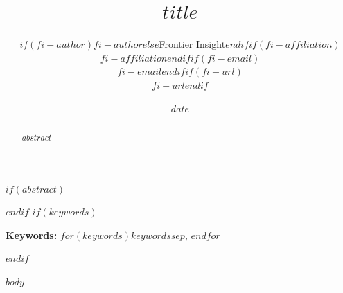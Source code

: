 \documentclass[11pt,a4paper]{article}
\title{$title$}
\author{$if(fi-author)$$fi-author$$else$Frontier Insight$endif$$if(fi-affiliation)$\\{\small $fi-affiliation$}$endif$$if(fi-email)$\\{\small $fi-email$}$endif$$if(fi-url)$\\{\small $fi-url$}$endif$}
\date{$date$}
\begin{document}
\maketitle

$if(abstract)$
\begin{abstract}
$abstract$
\end{abstract}
$endif$
$if(keywords)$
{\small\raggedright\noindent\textbf{Keywords:} $for(keywords)$$keywords$$sep$, $endfor$\par}\medskip
$endif$

$body$
\end{document}
